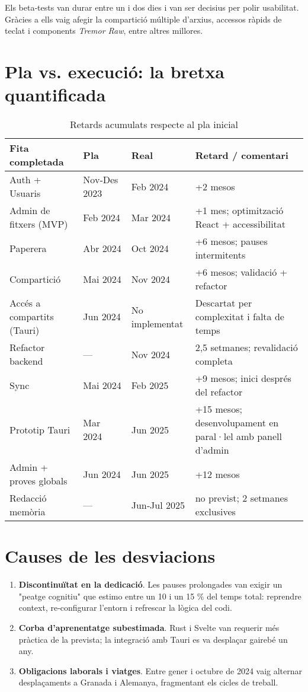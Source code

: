 Els beta‑tests van durar entre un i dos dies i van ser decisius per polir usabilitat. Gràcies a ells vaig afegir la compartició múltiple d'arxius, accessos ràpids de teclat i components \emph{Tremor Raw}, entre altres millores.

\section{Pla vs. execució: la bretxa quantificada}

\begin{table}[h]
  \centering
  \caption{Retards acumulats respecte al pla inicial}
  \label{tab:desviaciones}
  \begin{tabular}{@{}p{4cm}p{2.6cm}p{2.8cm}p{4.4cm}@{}}
    \toprule
    \textbf{Fita completada} & \textbf{Pla} & \textbf{Real} & \textbf{Retard / comentari} \\
    \midrule
    Auth + Usuaris & Nov‑Des 2023 & Feb 2024 & +2 mesos \\
    Admin de fitxers (MVP) & Feb 2024 & Mar 2024 & +1 mes; optimització React + accessibilitat \\
    Paperera & Abr 2024 & Oct 2024 & +6 mesos; pauses intermitents \\
    Compartició & Mai 2024 & Nov 2024 & +6 mesos; validació + refactor \\
    Accés a compartits (Tauri) & Jun 2024 & No implementat & Descartat per complexitat i falta de temps \\
    Refactor backend & — & Nov 2024 & 2,5 setmanes; revalidació completa \\
    Sync & Mai 2024 & Feb 2025 & +9 mesos; inici després del refactor \\
    Prototip Tauri & Mar 2024 & Jun 2025 & +15 mesos; desenvolupament en paral·lel amb panell d'admin \\
    Admin + proves globals & Jun 2024 & Jun 2025 & +12 mesos \\
    Redacció memòria & — & Jun‑Jul 2025 & no previst; 2 setmanes exclusives \\
    \bottomrule
  \end{tabular}
\end{table}

\section{Causes de les desviacions}
\begin{enumerate}
  \item \textbf{Discontinuïtat en la dedicació}. Les pauses prolongades van exigir un "peatge cognitiu" que estimo entre un 10 i un 15 \% del temps total: reprendre context, re‑configurar l'entorn i refrescar la lògica del codi.
  \item \textbf{Corba d'aprenentatge subestimada}. Rust i Svelte van requerir més pràctica de la prevista; la integració amb Tauri es va desplaçar gairebé un any.
  \item \textbf{Obligacions laborals i viatges}. Entre gener i octubre de 2024 vaig alternar desplaçaments a Granada i Alemanya, fragmentant els cicles de treball.
\end{enumerate}

